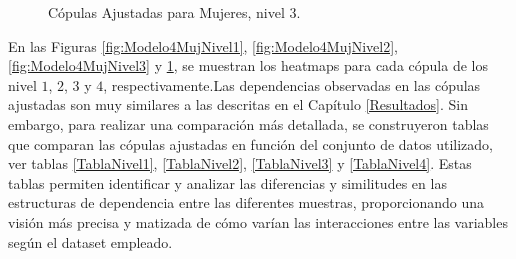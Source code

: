 \begin{figure}[H]
 \centering
    \caption{Cópulas Ajustadas para Mujeres, nivel $3$.}
    \label{fig:Modelo4MujNivel4}
\end{figure}


En las Figuras \ref{fig:Modelo4MujNivel1}, \ref{fig:Modelo4MujNivel2}, \ref{fig:Modelo4MujNivel3} y \ref{fig:Modelo4MujNivel4}, se muestran los heatmaps para cada cópula de los nivel $1$, $2$, $3$ y $4$, respectivamente.Las dependencias observadas en las cópulas ajustadas son muy similares a las descritas en el Capítulo \ref{Resultados}. Sin embargo, para realizar una comparación más detallada, se construyeron tablas que comparan las cópulas ajustadas en función del conjunto de datos utilizado, ver tablas \ref{TablaNivel1}, \ref{TablaNivel2}, \ref{TablaNivel3} y \ref{TablaNivel4}. Estas tablas permiten identificar y analizar las diferencias y similitudes en las estructuras de dependencia entre las diferentes muestras, proporcionando una visión más precisa y matizada de cómo varían las interacciones entre las variables según el dataset empleado.

